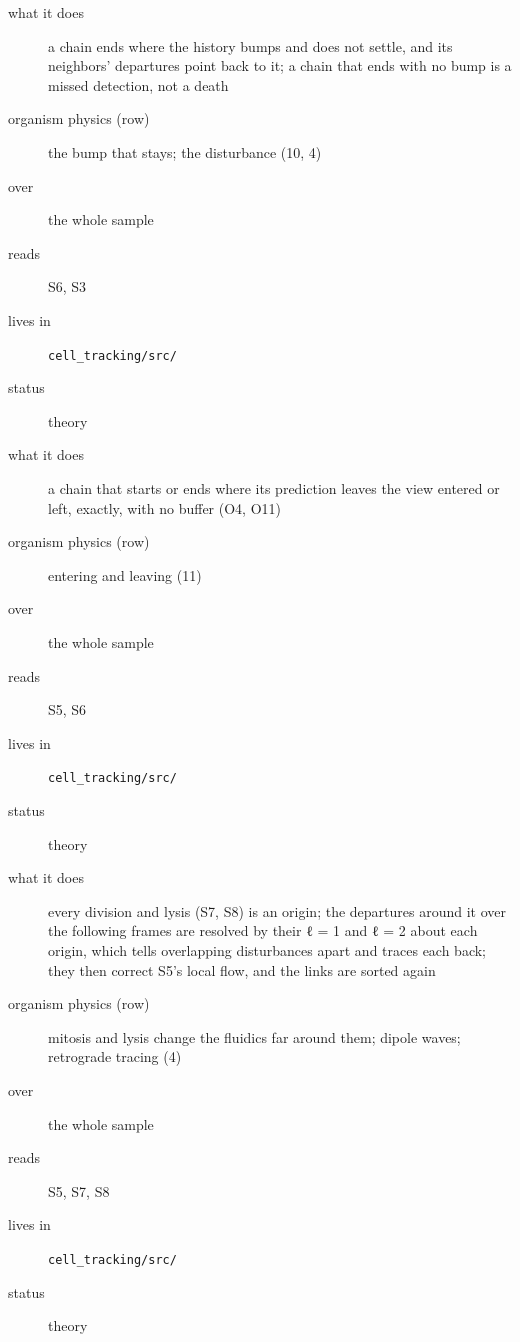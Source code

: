 \begin{description}
\item[{what it does}] a chain ends where the history bumps and does not settle, and its neighbors' departures point back to it; a chain that ends with no bump is a missed detection, not a death
\item[{organism physics (row)}] the bump that stays; the disturbance (10, 4)
\item[{over}] the whole sample
\item[{reads}] S6, S3
\item[{lives in}] \texttt{cell\_\allowbreak{}tracking/\allowbreak{}src/\allowbreak{}}
\item[{status}] theory
\end{description}

\begin{description}
\item[{what it does}] a chain that starts or ends where its prediction leaves the view entered or left, exactly, with no buffer (O4, O11)
\item[{organism physics (row)}] entering and leaving (11)
\item[{over}] the whole sample
\item[{reads}] S5, S6
\item[{lives in}] \texttt{cell\_\allowbreak{}tracking/\allowbreak{}src/\allowbreak{}}
\item[{status}] theory
\end{description}

\begin{description}
\item[{what it does}] every division and lysis (S7, S8) is an origin; the departures around it over the following frames are resolved by their ℓ = 1 and ℓ = 2 about each origin, which tells overlapping disturbances apart and traces each back; they then correct S5's local flow, and the links are sorted again
\item[{organism physics (row)}] mitosis and lysis change the fluidics far around them; dipole waves; retrograde tracing (4)
\item[{over}] the whole sample
\item[{reads}] S5, S7, S8
\item[{lives in}] \texttt{cell\_\allowbreak{}tracking/\allowbreak{}src/\allowbreak{}}
\item[{status}] theory
\end{description}

